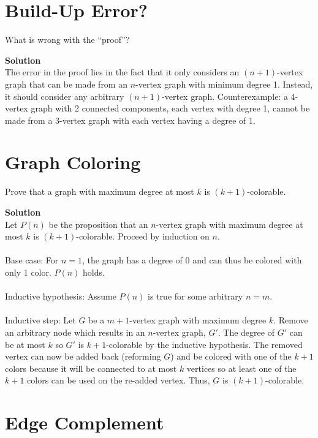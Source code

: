 \documentclass[11pt]{article}
\newcommand*{\Question}[1]{\section{#1}}
\newenvironment{Answer}{\vspace{10pt}\begin{mdframed}\textbf{Solution}\\}{\end{mdframed}\vfill\pagebreak[3]}
\newenvironment{Answer}{\vspace{10pt}}{\vfill\pagebreak[3]}
\begin{document}
\Question{Build-Up Error?}

What is wrong with the ``proof''?

\begin{Answer}

The error in the proof lies in the fact that it only considers an $(n+1)$-vertex graph that can be made from an $n$-vertex graph with minimum degree 1. Instead, it should consider any arbitrary $(n+1)$-vertex graph. Counterexample: a 4-vertex graph with 2 connected components, each vertex with degree 1, cannot be made from a 3-vertex graph with each vertex having a degree of 1.

\end{Answer}

\Question{Graph Coloring}

Prove that a graph with maximum degree at most $k$ is $(k+1)$-colorable.

\begin{Answer}

Let $P(n)$ be the proposition that an $n$-vertex graph with maximum degree at most $k$ is $(k+1)$-colorable. Proceed by induction on $n$.
\\
\\
Base case: For $n=1$, the graph has a degree of 0 and can thus be colored with only 1 color. $P(n)$ holds.
\\
\\
Inductive hypothesis: Assume $P(n)$ is true for some arbitrary $n=m$.
\\
\\
Inductive step: Let $G$ be a $m+1$-vertex graph with maximum degree $k$. Remove an arbitrary node which results in an $n$-vertex graph, $G'$. The degree of $G'$ can be at most $k$ so $G'$ is $k+1$-colorable by the inductive hypothesis. The removed vertex can now be added back (reforming $G$) and be colored with one of the $k+1$ colors because it will be connected to at most $k$ vertices so at least one of the $k+1$ colors can be used on the re-added vertex. Thus, $G$ is $(k+1)$-colorable. 

\end{Answer}

\Question{Edge Complement}
\end{document}
